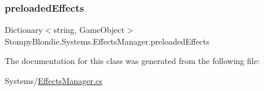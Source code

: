 \subsubsection{\texorpdfstring{preloaded\+Effects}{preloadedEffects}}
{\footnotesize\ttfamily Dictionary$<$string, Game\+Object$>$ Stompy\+Blondie.\+Systems.\+Effects\+Manager.\+preloaded\+Effects}



The documentation for this class was generated from the following file\+:\begin{DoxyCompactItemize}
\item 
Systems/\mbox{\hyperlink{_effects_manager_8cs}{Effects\+Manager.\+cs}}\end{DoxyCompactItemize}
